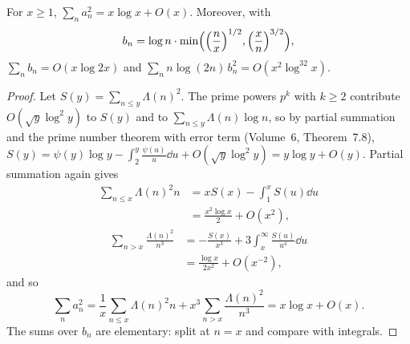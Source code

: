 \begin{lemma}\label{lem:lambdasq}
For $x\ge1$, $\sum_na_n^2=x\log x+O(x)$. Moreover, with
\[
b_n=\log n\cdot\min\Bigl(\Bigl(\frac nx\Bigr)^{1/2},\Bigl(\frac xn\Bigr)^{3/2}\Bigr),
\]
$\sum_nb_n=O(x\log2x)$ and $\sum_nn\log(2n)\,b_n^2=O(x^2\log^32x)$.
\end{lemma}
\begin{proof}
Let $S(y)=\sum_{n\le y}\Lambda(n)^2$. The prime powers $p^k$ with $k\ge2$ contribute $O(\sqrt y\log^2y)$ to $S(y)$ and to $\sum_{n\le y}\Lambda(n)\log n$, so by partial summation and the prime number theorem with error term (Volume~6, Theorem~7.8), $S(y)=\psi(y)\log y-\int_2^y\frac{\psi(u)}u\dd u+O(\sqrt y\log^2y)=y\log y+O(y)$. Partial summation again gives
\[
\begin{aligned}\sum_{n\le x}\Lambda(n)^2n&=xS(x)-\int_1^xS(u)\dd u\\&=\frac{x^2\log x}2+O(x^2),\end{aligned}
\]
\[
\begin{aligned}\sum_{n>x}\frac{\Lambda(n)^2}{n^3}&=-\frac{S(x)}{x^3}+3\int_x^\infty\frac{S(u)}{u^4}\dd u\\&=\frac{\log x}{2x^2}+O(x^{-2}),\end{aligned}
\]
and so
\[
\sum_na_n^2=\frac1x\sum_{n\le x}\Lambda(n)^2n+x^3\sum_{n>x}\frac{\Lambda(n)^2}{n^3}=x\log x+O(x).
\] The sums over $b_n$ are elementary: split at $n=x$ and compare with integrals.
\end{proof}


